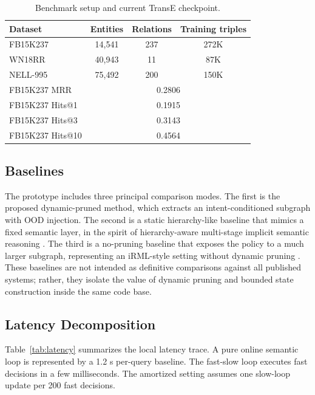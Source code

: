 \documentclass[journal]{IEEEtran}
\begin{document}
\begin{table}[!t]
\centering
\caption{Benchmark setup and current TransE checkpoint.}
\label{tab:datasets}
\begin{tabular}{lccc}
\toprule
Dataset & Entities & Relations & Training triples\\
\midrule
FB15K237 & 14,541 & 237 & 272K\\
WN18RR & 40,943 & 11 & 87K\\
NELL-995 & 75,492 & 200 & 150K\\
\midrule
FB15K237 MRR & \multicolumn{3}{c}{0.2806}\\
FB15K237 Hits@1 & \multicolumn{3}{c}{0.1915}\\
FB15K237 Hits@3 & \multicolumn{3}{c}{0.3143}\\
FB15K237 Hits@10 & \multicolumn{3}{c}{0.4564}\\
\bottomrule
\end{tabular}
\end{table}

\subsection{Baselines}

The prototype includes three principal comparison modes. The first is the proposed dynamic-pruned method, which extracts an intent-conditioned subgraph with OOD injection. The second is a static hierarchy-like baseline that mimics a fixed semantic layer, in the spirit of hierarchy-aware multi-stage implicit semantic reasoning \cite{sun2026hierarchy}. The third is a no-pruning baseline that exposes the policy to a much larger subgraph, representing an iRML-style setting without dynamic pruning \cite{xiao2024reasoning,xiao2023imitation}. These baselines are not intended as definitive comparisons against all published systems; rather, they isolate the value of dynamic pruning and bounded state construction inside the same code base.

\subsection{Latency Decomposition}

Table~\ref{tab:latency} summarizes the local latency trace. A pure online semantic loop is represented by a 1.2 s per-query baseline. The fast-slow loop executes fast decisions in a few milliseconds. The amortized setting assumes one slow-loop update per 200 fast decisions.
\end{document}
